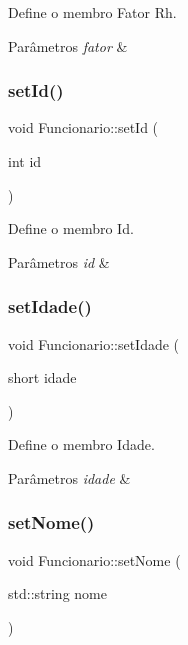 Define o membro Fator Rh. 


\begin{DoxyParams}{Parâmetros}
{\em fator} & \\
\hline
\end{DoxyParams}
\mbox{\label{classFuncionario_acc0b430d08b2c459682d7bb01c0ab1c4}} 
\subsubsection{\texorpdfstring{set\+Id()}{setId()}}
{\footnotesize\ttfamily void Funcionario\+::set\+Id (\begin{DoxyParamCaption}\item[{int}]{id }\end{DoxyParamCaption})}



Define o membro Id. 


\begin{DoxyParams}{Parâmetros}
{\em id} & \\
\hline
\end{DoxyParams}
\mbox{\label{classFuncionario_af85eeb2e2b606d60da800c7084f23769}} 
\subsubsection{\texorpdfstring{set\+Idade()}{setIdade()}}
{\footnotesize\ttfamily void Funcionario\+::set\+Idade (\begin{DoxyParamCaption}\item[{short}]{idade }\end{DoxyParamCaption})}



Define o membro Idade. 


\begin{DoxyParams}{Parâmetros}
{\em idade} & \\
\hline
\end{DoxyParams}
\mbox{\label{classFuncionario_a32e01bd23e422ab7598cd04dac51eb82}} 
\subsubsection{\texorpdfstring{set\+Nome()}{setNome()}}
{\footnotesize\ttfamily void Funcionario\+::set\+Nome (\begin{DoxyParamCaption}\item[{std\+::string}]{nome }\end{DoxyParamCaption})}



